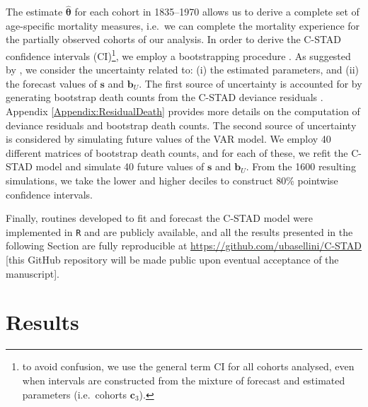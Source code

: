 \documentclass[11pt, a4paper]{article}
\begin{document}
The estimate $\hat{\bm{\theta}}$ for each cohort in 1835--1970 allows us to derive a complete set of age-specific mortality measures, i.e.~we can complete the mortality experience for the partially observed cohorts of our analysis. In order to derive the C-STAD confidence intervals (CI)\footnote{to avoid confusion, we use the general term CI for all cohorts analysed, even when intervals are constructed from the mixture of forecast and estimated parameters (i.e.~cohorts $\bm{c}_3$).}, we employ a bootstrapping procedure \citep{efron1994introduction}. As suggested by \cite{keilman2006prediction}, we consider the uncertainty related to: (i) the estimated parameters, and (ii) the forecast values of $\bm{s}$ and $\bm{b}_U$. The first source of uncertainty is accounted for by generating bootstrap death counts from the C-STAD deviance residuals \cite[as in, for example,][]{koissi2006evaluating,renshaw2008simulation,ouellette2012regional}. Appendix \ref{Appendix:ResidualDeath} provides more details on the computation of deviance residuals and bootstrap death counts. The second source of uncertainty is considered by simulating future values of the VAR model. We employ 40 different matrices of bootstrap death counts, and for each of these, we refit the C-STAD model and simulate 40 future values of $\bm{s}$ and $\bm{b}_U$. From the 1600 resulting simulations, we take the lower and higher deciles to construct 80\% pointwise confidence intervals.

Finally, routines developed to fit and forecast the C-STAD model were implemented in \texttt{R} \citep{Rcite} and are publicly available, and all the results presented in the following Section are fully reproducible at \url{https://github.com/ubasellini/C-STAD} [this GitHub repository will be made public upon eventual acceptance of the manuscript]. 

\section{Results}
\label{Sec:Results}
\end{document}
